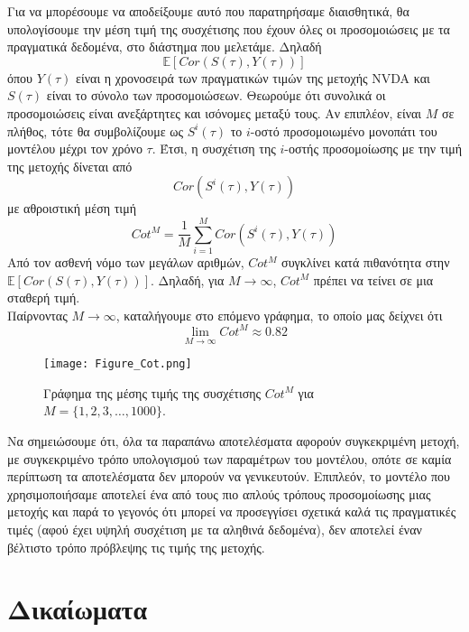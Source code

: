 \documentclass[12pt,a4paper,twoside,openany]{book}
\begin{document}
	\noindent Για να μπορέσουμε να αποδείξουμε αυτό που παρατηρήσαμε διαισθητικά, θα υπολογίσουμε την μέση τιμή της συσχέτισης που έχουν όλες οι προσομοιώσεις με τα πραγματικά δεδομένα, στο διάστημα που μελετάμε. Δηλαδή
	\[\mathbb{E}[Cor(S(\tau), Y(\tau))] \]
	όπου $Y(\tau)$ είναι η χρονοσειρά των πραγματικών τιμών της μετοχής NVDA και $S(\tau)$ είναι το σύνολο των προσομοιώσεων. Θεωρούμε ότι συνολικά οι προσομοιώσεις είναι ανεξάρτητες και ισόνομες μεταξύ τους. Αν επιπλέον, είναι $M$ σε πλήθος, τότε θα συμβολίζουμε ως $S^i(\tau)$ το $i$-οστό προσομοιωμένο μονοπάτι του μοντέλου μέχρι τον χρόνο $\tau$. Έτσι, η συσχέτιση της $i$-οστής προσομοίωσης με την τιμή της μετοχής δίνεται από 
	\[Cor(S^i(\tau), Y(\tau))\]
	με αθροιστική μέση τιμή
	\[Cot^M= \frac{1}{M}\sum_{i=1}^{M} Cor(S^i(\tau), Y(\tau))\]
	Από τον ασθενή νόμο των μεγάλων αριθμών, $Cot^M$ συγκλίνει κατά πιθανότητα στην $\mathbb{E}[Cor(S(\tau), Y(\tau))]$. Δηλαδή, για $M\to\infty$, $Cot^M$ πρέπει να τείνει σε μια σταθερή τιμή. 
	\vspace{2.5mm}\\
	Παίρνοντας $M\to\infty$, καταλήγουμε στο επόμενο γράφημα, το οποίο μας δείχνει ότι 
	\[\lim_{M\to\infty}Cot^M \approx 0.82\]	
	\begin{figure}[h]
		\centering
		\texttt{[image: Figure\_Cot.png]}
		\caption{Γράφημα της μέσης τιμής της συσχέτισης $Cot^M$ για $M=\{1,2,3,\dots,1000\}$.}
		\label{fig:Cot}
	\end{figure}
 	
 	\noindent Να σημειώσουμε ότι, όλα τα παραπάνω αποτελέσματα αφορούν συγκεκριμένη μετοχή, με συγκεκριμένο τρόπο υπολογισμού των παραμέτρων του μοντέλου, οπότε σε καμία περίπτωση τα αποτελέσματα δεν μπορούν να γενικευτούν. Επιπλεόν, το μοντέλο που χρησιμοποιήσαμε αποτελεί ένα από τους πιο απλούς τρόπους προσομοίωσης μιας μετοχής και παρά το γεγονός ότι μπορεί να προσεγγίσει σχετικά καλά τις πραγματικές τιμές (αφού έχει υψηλή συσχέτιση με τα αληθινά δεδομένα), δεν αποτελεί έναν βέλτιστο τρόπο πρόβλεψης τις τιμής της μετοχής.
 
 
 
 
 
 
\chapter{Δικαίωματα} 
	
\end{document}
